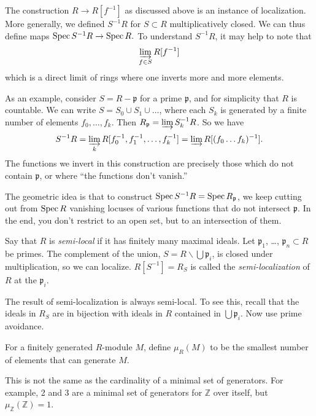 \begin{remark} 
The construction $R \to R[f^{-1}]$ as discussed above is an
instance of
localization. More generally, we defined $S^{-1}R$ for $S
\subset R$
multiplicatively closed. We can thus define maps
\( \operatorname{Spec} S^{-1}R \to \operatorname{Spec} R . \)
To understand $S^{-1}R$, it may help to note that
\[ \varinjlim_{f \in S} R[f^{-1}]  \]
which is a direct limit of rings where one inverts more and more elements.

As an example, consider $S = R - \mathfrak{p}$ for a prime
$\mathfrak{p}$, and for
simplicity that $R$ is countable. We can write $S =
S_0 \cup S_1 \cup \dots$, where each $S_k$ is generated by a
finite number of
elements $f_0, \dots, f_k$. Then $R_{\mathfrak{p}} = \varinjlim
S_k^{-1} R$.
So we have
\[ S^{-1}R = \varinjlim_k R[f_0^{-1} , f_1^{-1}, \dots, f_k^{-1}
] = \varinjlim
R[(f_0\dots f_k)^{-1}]. \]
The functions we invert in this construction are precisely those
which do not
contain $\mathfrak{p}$, or where ``the functions don't vanish.''

The geometric idea is
that to construct $\operatorname{Spec} S^{-1}R = \operatorname{Spec} R_{\mathfrak{p}}$, we
keep cutting out
from $\operatorname{Spec} R$ vanishing locuses of various functions that do
not
intersect $\mathfrak{p}$. In the end, you don't restrict to an
open set, but
to an intersection of them.
\end{remark} 
\begin{exercise} \label{semilocal} 
Say that    $R$ is \emph{semi-local} if it has finitely many maximal ideals.
Let $\mathfrak{p}_1$, \dots, $\mathfrak{p}_n\subset R$ be primes. The complement of
the union, $S=R\smallsetminus \bigcup \mathfrak{p}_i$, is closed under
multiplication, so we can
 localize. $R[S^{-1}] = R_S$ is called the \emph{semi-localization}
  of $R$ at the $\mathfrak{p}_i$.
 
The result of semi-localization is always semi-local. To see this, recall that
the ideals
 in $R_S$ are in bijection with ideals in $R$ contained in $\bigcup
 \mathfrak{p}_i$. Now use prime avoidance.
\end{exercise}

\begin{definition}
For a finitely generated $R$-module $M$, define $\mu_R(M)$ to be the smallest
number
   of elements that can generate $M$.
 \end{definition}
This is not the same as the cardinality of a minimal set of generators. For
example, 2
and 3 are a minimal set of generators for $\mathbb{Z}$ over itself, but
$\mu_\mathbb{Z} (\mathbb{Z}) =1$.


